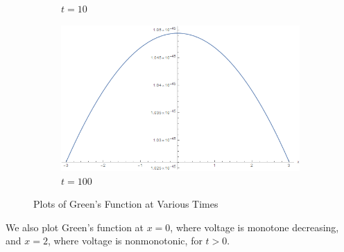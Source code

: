 \documentclass[12pt]{article}
\begin{document}
\begin{figure}[H]
\begin{subfigure}[h]{0.4\textwidth}
        \caption{$t=10$}
        \label{fig:t10}
    \end{subfigure}
    \begin{subfigure}[h]{0.4\textwidth}
        \includegraphics[width=\textwidth]{Part1Plots/t100}
        \caption{$t=100$}
        \label{fig:t100}
    \end{subfigure}
    \caption{Plots of Green's Function at Various Times}\label{fig:timeplots}
\end{figure}

We also plot Green's function at $x=0$, where voltage is monotone decreasing, and $x=2$, where voltage is nonmonotonic, for $t>0$.
\end{document}
